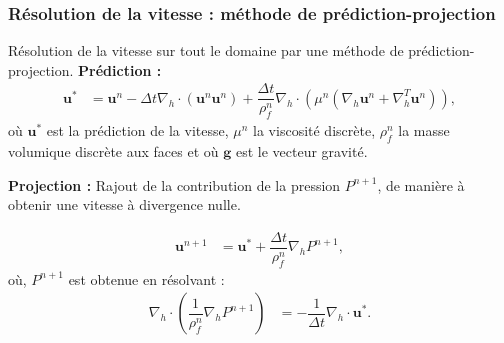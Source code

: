 \documentclass{beamer}
\newcommand{\vect}[1]{\bm{#1}}
\newcommand{\npl}{{n+1}}
\renewcommand{\frac}{\dfrac}
\begin{document}
\begin{frame}
    \frametitle{Résolution de la vitesse : méthode de prédiction-projection}
    \footnotesize
    \begin{ceablock}{Résolution de la vitesse sur tout le domaine par une méthode de prédiction-projection.}
	\textbf{Prédiction :}
	\begin{align} 
		\vect{u}^* &= \vect{u}^n - \Delta t \nabla_h \cdot (\vect{u}^n \vect{u}^n) + \frac{\Delta t}{\rho^n_f} \nabla_h \cdot(\mu^n(\nabla_h \vect{u}^n+\nabla^T_h \vect{u}^n)),
	\end{align}
	où $\vect{u}^*$ est la prédiction de la vitesse, $\mu^n$ la viscosité discrète, $\rho^n_f$ la masse volumique discrète aux faces  et où $\vect{g}$ est le vecteur gravité.  %
	

	\textbf{Projection :}
Rajout de la contribution de la pression $P^\npl$, de manière à obtenir une vitesse à divergence nulle.

	\begin{align}
		\vect{u}^{n+1} &= \vect{u}^* + \frac{\Delta t}{\rho^n_f} \nabla_h P^{n+1},
	\end{align}
	où, $P^{n+1}$ est obtenue en résolvant : 
\begin{align}
\label{eq:Pression}
					 \nabla_h \cdot  \left( \frac{1}{\rho^n_f} \nabla_h P^\npl \right) &=  -\frac{1}{\Delta t} \nabla_h \cdot \vect{u}^*. 
\end{align}
	\end{ceablock}

\end{frame}
\end{document}
